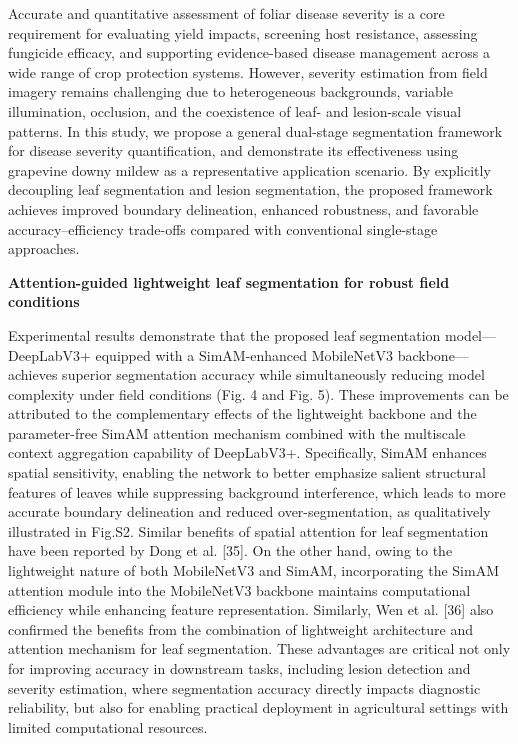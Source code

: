 \documentclass[
]{article}
\begin{document}
Accurate and quantitative assessment of foliar disease severity is a
core requirement for evaluating yield impacts, screening host
resistance, assessing fungicide efficacy, and supporting evidence-based
disease management across a wide range of crop protection systems.
However, severity estimation from field imagery remains challenging due
to heterogeneous backgrounds, variable illumination, occlusion, and the
coexistence of leaf- and lesion-scale visual patterns. In this study, we
propose a general dual-stage segmentation framework for disease severity
quantification, and demonstrate its effectiveness using grapevine downy
mildew as a representative application scenario. By explicitly
decoupling leaf segmentation and lesion segmentation, the proposed
framework achieves improved boundary delineation, enhanced robustness,
and favorable accuracy--efficiency trade-offs compared with conventional
single-stage approaches.

\textbf{Attention-guided lightweight leaf segmentation for robust field
conditions}

Experimental results demonstrate that the proposed leaf segmentation
model---DeepLabV3+ equipped with a SimAM-enhanced MobileNetV3
backbone---achieves superior segmentation accuracy while simultaneously
reducing model complexity under field conditions (Fig. 4 and Fig. 5).
These improvements can be attributed to the complementary effects of the
lightweight backbone and the parameter-free SimAM attention mechanism
combined with the multiscale context aggregation capability of
DeepLabV3+. Specifically, SimAM enhances spatial sensitivity, enabling
the network to better emphasize salient structural features of leaves
while suppressing background interference, which leads to more accurate
boundary delineation and reduced over-segmentation, as qualitatively
illustrated in Fig.S2. Similar benefits of spatial attention for leaf
segmentation have been reported by Dong et al. {[}35{]}. On the other
hand, owing to the lightweight nature of both MobileNetV3 and SimAM,
incorporating the SimAM attention module into the MobileNetV3 backbone
maintains computational efficiency while enhancing feature
representation. Similarly, Wen et al. {[}36{]} also confirmed the
benefits from the combination of lightweight architecture and attention
mechanism for leaf segmentation. These advantages are critical not only
for improving accuracy in downstream tasks, including lesion detection
and severity estimation, where segmentation accuracy directly impacts
diagnostic reliability, but also for enabling practical deployment in
agricultural settings with limited computational resources.
\end{document}
